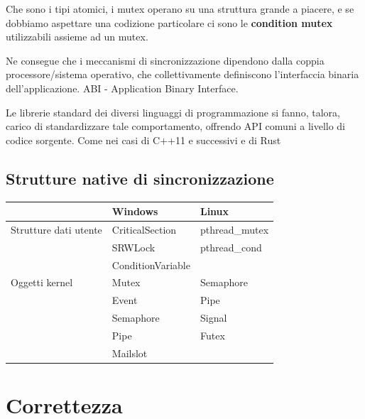 Che sono i tipi atomici, i mutex operano su una struttura grande a piacere, e se dobbiamo aspettare
una codizione particolare ci sono le \textbf{condition mutex} utilizzabili assieme ad un mutex.

Ne consegue che i meccanismi di sincronizzazione dipendono dalla coppia
processore/sistema operativo, che collettivamente definiscono l'interfaccia
binaria dell'applicazione. ABI - Application Binary Interface.

Le librerie standard dei diversi linguaggi di programmazione si fanno, talora,
carico di standardizzare tale comportamento, offrendo API comuni a livello di
codice sorgente. Come nei casi di C++11 e successivi e di Rust


\subsection{Strutture native di sincronizzazione}

\begin{table}[h!]
  \renewcommand{\arraystretch}{1.5}
  \centering
  \begin{tabular}{l l l}
    \toprule
                          & \textbf{Windows}  & \textbf{Linux} \\
    \midrule
    Strutture dati utente & CriticalSection   & pthread\_mutex \\
                          & SRWLock           &
    pthread\_cond                                              \\
                          & ConditionVariable &                \\
    \midrule
    Oggetti kernel        & Mutex             & Semaphore      \\
                          & Event             & Pipe           \\
                          & Semaphore         & Signal         \\
                          & Pipe              & Futex          \\
                          & Mailslot          &                \\
    \bottomrule
  \end{tabular}
\end{table}


\section{Correttezza}

